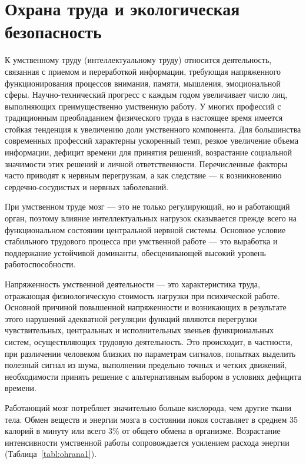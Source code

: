 \documentclass[14pt,a4paper]{reportmod}
\begin{document}
\chapter*{Охрана труда и экологическая безопасность}
К умственному труду (интеллектуальному труду) относится деятельность, связанная с приемом и переработкой информации, требующая напряженного функционирования процессов внимания, памяти, мышления, эмоциональной сферы. Научно-технический прогресс с каждым годом увеличивает число лиц, выполняющих преимущественно умственную работу. У многих профессий с традиционным преобладанием физического труда в настоящее время имеется стойкая тенденция к увеличению доли умственного компонента. Для большинства современных профессий характерны ускоренный темп, резкое увеличение объема информации, дефицит времени для принятия решений, возрастание социальной значимости этих решений и личной ответственности. Перечисленные факторы часто приводят к нервным перегрузкам, а как следствие — к возникновению сердечно-сосудистых и нервных заболеваний.

При умственном труде мозг — это не только регулирующий, но и работающий орган, поэтому влияние интеллектуальных нагрузок сказывается прежде всего на функциональном состоянии центральной нервной системы. Основное условие стабильного трудового процесса при умственной работе — это выработка и поддержание устойчивой доминанты, обесценивающей высокий уровень работоспособности.

Напряженность умственной деятельности — это характеристика труда, отражающая физиологическую стоимость нагрузки при психической работе. Основной причиной повышенной напряженности и возникающих в результате этого нарушений адекватной регуляции функций являются перегрузки чувствительных, центральных и исполнительных звеньев функциональных систем, осуществляющих трудовую деятельность. Это происходит, в частности, при различении человеком близких по параметрам сигналов, попытках выделить полезный сигнал из шума, выполнении предельно точных и четких движений, необходимости принять решение с альтернативным выбором в условиях дефицита времени.

Работающий мозг потребляет значительно больше кислорода, чем другие ткани тела. Обмен веществ и энергии мозга в состоянии покоя составляет в среднем 35 калорий в минуту или всего 3\% от общего обмена в организме. Возрастание интенсивности умственной работы сопровождается усилением расхода энергии (Таблица~\ref{tabl:ohrana1}).
\end{document}
